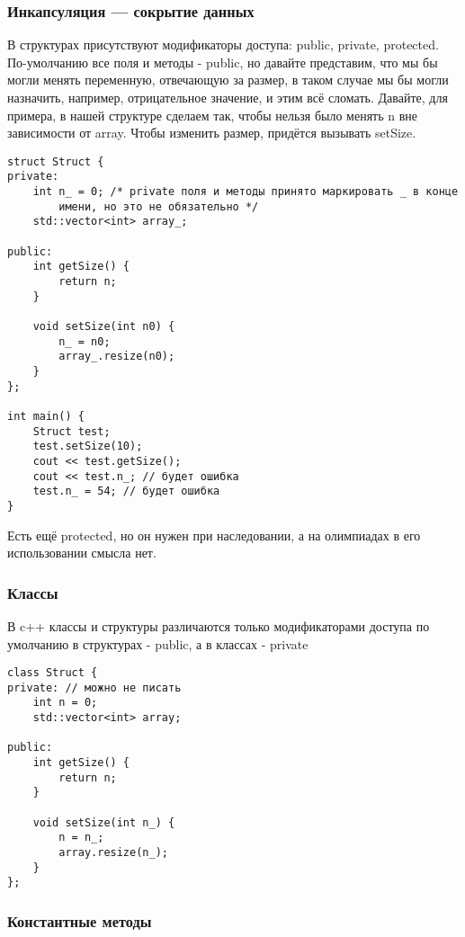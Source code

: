 \subsubsection{Инкапсуляция — сокрытие данных}

В структурах присутствуют модификаторы доступа: public, private, protected.
По-умолчанию все поля и методы - public, но давайте представим, что мы бы могли менять переменную, отвечающую за размер,
в таком случае мы бы могли назначить, например, отрицательное значение, и этим всё сломать.
Давайте, для примера, в нашей структуре сделаем так, чтобы нельзя было менять n вне зависимости от array.
Чтобы изменить размер, придётся вызывать setSize.

\begin{verbatim}
struct Struct {
private:
    int n_ = 0; /* private поля и методы принято маркировать _ в конце
        имени, но это не обязательно */
    std::vector<int> array_;

public:
    int getSize() {
        return n;
    }

    void setSize(int n0) {
        n_ = n0;
        array_.resize(n0);
    }
};

int main() {
    Struct test;
    test.setSize(10);
    cout << test.getSize();
    cout << test.n_; // будет ошибка
    test.n_ = 54; // будет ошибка
}
\end{verbatim}

Есть ещё protected, но он нужен при наследовании, а на олимпиадах в его использовании смысла нет.

\subsubsection{Классы}

В c++ классы и структуры различаются только модификаторами доступа по умолчанию в структурах - public, а в классах - private

\begin{verbatim}
class Struct {
private: // можно не писать
    int n = 0;
    std::vector<int> array;

public:
    int getSize() {
        return n;
    }

    void setSize(int n_) {
        n = n_;
        array.resize(n_);
    }
};
\end{verbatim}

\subsubsection{Константные методы}

